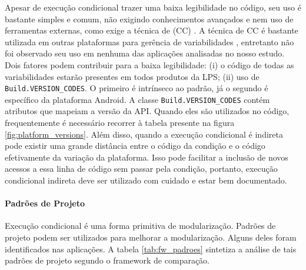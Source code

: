 Apesar de execução condicional trazer uma baixa legibilidade no código, seu uso
é bastante simples e comum, não exigindo conhecimentos avançados e nem uso de
ferramentas externas, como exige a técnica de 
(CC)
\cite{Medeiros2015}. A técnica de CC é bastante utilizada em outras plataformas
para gerência de variabilidades \cite{Liebig2010}, entretanto não foi observado
seu uso em nenhuma das aplicações analisadas no nosso estudo. Dois fatores podem
contribuir para a baixa legibilidade: (i) o código de todas as variabilidades
estarão presentes em todos produtos da LPS; (ii) uso de \texttt{Build.VERSION\_CODES}.
O primeiro é intrínseco ao padrão, já o segundo é específico da plataforma Android.
A classe \texttt{Build.VERSION\_CODES} contém atributos que mapeiam a versão da API.
Quando eles são utilizados no código, frequentemente é necessário recorrer à tabela
presente na figura \ref{fig:platform_versions}. Além disso, quando a execução
condicional é indireta pode existir uma grande distância entre o código da condição
e o código efetivamente da variação da plataforma. Isso pode facilitar a inclusão de
novos acessos a essa linha de código sem passar pela condição, portanto, execução
condicional indireta deve ser utilizado com cuidado e estar bem documentado.

\paragraph{Padrões de Projeto}
Execução condicional é uma forma primitiva de modularização. Padrões de projeto
podem ser utilizados para melhorar a modularização. Alguns deles foram identificados
nas aplicações. A tabela \ref{tab:fw_padroes} sintetiza a análise de tais padrões de
projeto segundo o framework de comparação.

